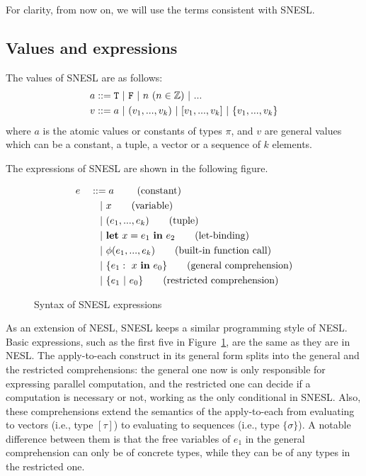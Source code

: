 For clarity, from now on, we will use the terms consistent with SNESL.

\subsection{Values and expressions}

The values of SNESL are as follows:
\begin{align*}
& a ::=  \T \ | \ \F \ | \ n \ (n \in \mathbb{Z}) \ | \ ... \\
& v ::=  a \ | \ (v_1,...,v_k) \ | \ [v_1,...,v_k] \ | \ \{v_1,...,v_k\} 
\end{align*}
where $a$ is the atomic values or constants of types $\pi$, and $v$ are
 general values which can be a constant, a tuple, a vector or a sequence of $k$ elements.  

The expressions of SNESL are shown in the following figure.

\begin{figure}[H]\large 
\begin{alignat*}{2}
& e &&::=  a \     \tag{constant} \\
&   && \quad | \ x  \tag{variable} \\
&   && \quad | \ (e_1,...,e_k) \tag{tuple}\\
&   && \quad | \ \mathbf{let} \ x = e_1 \ \mathbf{in} \ e_2 \tag{let-binding}\\
&   && \quad | \ \phi{(e_1,...,e_k)}  \tag{built-in function call} \\
&   && \quad | \ \{e_1: \ x \ \mathbf{in} \ e_0 \} \tag{general comprehension} \\
&   && \quad | \ \{e_1 \ | \ e_0 \}\tag {restricted comprehension} 
\end{alignat*}
\caption{Syntax of SNESL expressions \label{fig-snesl-exps}}
\end{figure}

As an extension of NESL, SNESL keeps a similar programming style of NESL. 
Basic expressions, such as the first five in Figure~\ref{fig-snesl-exps}, are the same as they are in NESL. 
The apply-to-each construct in its general form splits into the general and the restricted comprehensions:
the general one now is only responsible for expressing parallel computation,
and the restricted one can decide if a computation is necessary or not, working as the only conditional in SNESL.
Also, these comprehensions extend the semantics of the apply-to-each from evaluating to vectors (i.e., type $[\tau]$) to evaluating to sequences (i.e., type $\{\sigma\}$). 
A notable difference between them is that the free variables of $e_1$ in the general comprehension can only be of concrete types, while they can be of any types in the restricted one.

